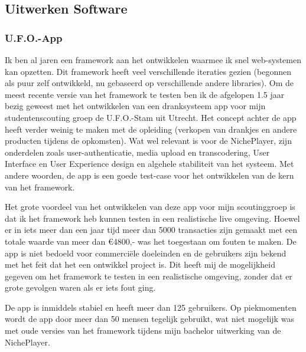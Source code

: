 \subsection{Uitwerken Software}
\subsubsection*{U.F.O.-App}
Ik ben al jaren een framework aan het ontwikkelen waarmee ik snel web-systemen kan opzetten. Dit framework heeft veel verschillende iteraties gezien (begonnen als puur zelf ontwikkeld, nu gebaseerd op verschillende andere libraries). Om de meest recente versie van het framework te testen ben ik de afgelopen 1.5 jaar bezig geweest met het ontwikkelen van een dranksysteem app voor mijn studentenscouting groep de U.F.O.-Stam uit Utrecht. Het concept achter de app heeft verder weinig te maken met de opleiding (verkopen van drankjes en andere producten tijdens de opkomsten). Wat wel relevant is voor de NichePlayer, zijn onderdelen zoals user-authenticatie, media upload en transcodering, User Interface en User Experience design en algehele stabiliteit van het systeem. Met andere woorden, de app is een goede test-case voor het ontwikkelen van de kern van het framework.

Het grote voordeel van het ontwikkelen van deze app voor mijn scoutinggroep is dat ik het framework heb kunnen testen in een realistische live omgeving. Hoewel er in iets meer dan een jaar tijd meer dan 5000 transacties zijn gemaakt met een totale waarde van meer dan €4800,- was het toegestaan om fouten te maken. De app is niet bedoeld voor commerciële doeleinden en de gebruikers zijn bekend met het feit dat het een ontwikkel project is. Dit heeft mij de mogelijkheid gegeven om het framework te testen in een realistische omgeving, zonder dat er grote gevolgen waren als er iets fout ging.

De app is inmiddels stabiel en heeft meer dan 125 gebruikers. Op piekmomenten wordt de app door meer dan 50 mensen tegelijk gebruikt, wat niet mogelijk was met oude versies van het framework tijdens mijn bachelor uitwerking van de NichePlayer.

